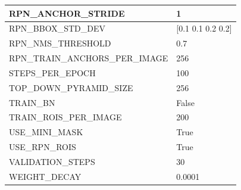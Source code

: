 \begin{longtable}[h]{|l|l|}
	RPN\_ANCHOR\_STRIDE             & 1                                                                                                                                                                                      \\ \hline
	RPN\_BBOX\_STD\_DEV             & {[}0.1 0.1 0.2 0.2{]}                                                                                                                                                                  \\ \hline
	RPN\_NMS\_THRESHOLD             & 0.7                                                                                                                                                                                    \\ \hline
	RPN\_TRAIN\_ANCHORS\_PER\_IMAGE & 256                                                                                                                                                                                    \\ \hline
	STEPS\_PER\_EPOCH               & 100                                                                                                                                                                                    \\ \hline
	TOP\_DOWN\_PYRAMID\_SIZE        & 256                                                                                                                                                                                    \\ \hline
	TRAIN\_BN                       & False                                                                                                                                                                                  \\ \hline
	TRAIN\_ROIS\_PER\_IMAGE         & 200                                                                                                                                                                                    \\ \hline
	USE\_MINI\_MASK                 & True                                                                                                                                                                                   \\ \hline
	USE\_RPN\_ROIS                  & True                                                                                                                                                                                   \\ \hline
	VALIDATION\_STEPS               & 30                                                                                                                                                                                     \\ \hline
	WEIGHT\_DECAY                   & 0.0001
	\\ \hline                 
\end{longtable}

